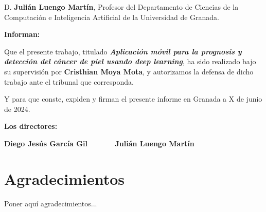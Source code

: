 \vspace{0.5cm}

D. \textbf{Julián Luengo Martín}, Profesor del Departamento de Ciencias de la Computación e Inteligencia Artificial
 de la Universidad de Granada.


\vspace{0.5cm}

\textbf{Informan:}

\vspace{0.5cm}

Que el presente trabajo, titulado \textit{\textbf{Aplicación móvil para la prognosis y detección del cáncer de piel usando deep learning}},
ha sido realizado bajo su supervisión por \textbf{Cristhian Moya Mota}, y autorizamos la defensa de dicho trabajo ante el tribunal
que corresponda.

\vspace{0.5cm}

Y para que conste, expiden y firman el presente informe en Granada a X de junio de 2024.

\vspace{1cm}

\textbf{Los directores:}

\vspace{5cm}

\noindent \textbf{Diego Jesús García Gil \ \ \ \ \ \ Julián Luengo Martín}

\chapter*{Agradecimientos}
\thispagestyle{empty}

       \vspace{1cm}


Poner aquí agradecimientos...

